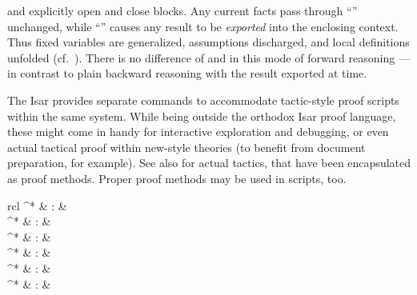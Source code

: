 \begin{isabellebody}
\begin{isamarkuptext}
\begin{descr}
  \item [\mbox{\isa{\isacommand{{\isacharbraceleft}}}} and \mbox{\isa{\isacommand{{\isacharbraceright}}}}] explicitly open and close
  blocks.  Any current facts pass through ``\mbox{\isa{\isacommand{{\isacharbraceleft}}}}''
  unchanged, while ``\mbox{\isa{\isacommand{{\isacharbraceright}}}}'' causes any result to be
  \emph{exported} into the enclosing context.  Thus fixed variables
  are generalized, assumptions discharged, and local definitions
  unfolded (cf.\ ).  There is no difference
  of \mbox{} and \mbox{} in this mode of
  forward reasoning --- in contrast to plain backward reasoning with
  the result exported at \mbox{} time.

  \end{descr}%
\end{isamarkuptext}%
\isamarkuptrue%
%
\isamarkuptrue%
%
\begin{isamarkuptext}%
The Isar provides separate commands to accommodate tactic-style
  proof scripts within the same system.  While being outside the
  orthodox Isar proof language, these might come in handy for
  interactive exploration and debugging, or even actual tactical proof
  within new-style theories (to benefit from document preparation, for
  example).  See also  for actual tactics, that
  have been encapsulated as proof methods.  Proper proof methods may
  be used in scripts, too.

  \begin{matharray}{rcl}
    \mbox{}^* & : &  \\
    \mbox{}^* & : &  \\
    \mbox{}^* & : &  \\
    \mbox{}^* & : &  \\
    \mbox{}^* & : &  \\
    \mbox{}^* & : &  \\
  \end{matharray}


\end{isamarkuptext}
\end{isabellebody}
